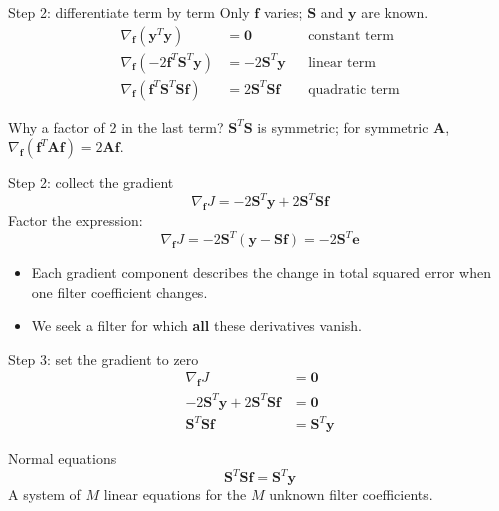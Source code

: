 \documentclass[aspectratio=169,11pt]{beamer}
\newcommand{\Smat}{\mathbf S}
\newcommand{\fvec}{\mathbf f}
\newcommand{\yvec}{\mathbf y}
\newcommand{\evec}{\mathbf e}
\begin{document}
\begin{frame}{Step 2: differentiate term by term}
\small Only $\fvec$ varies; $\Smat$ and $\yvec$ are known.
\begin{align*}
\nabla_{\fvec}(\yvec^T\yvec)&=\mathbf0&&\text{constant term}\\[7pt]
\nabla_{\fvec}(-2\fvec^T\Smat^T\yvec)&=-2\Smat^T\yvec&&\text{linear term}\\[7pt]
\nabla_{\fvec}(\fvec^T\Smat^T\Smat\fvec)&=2\Smat^T\Smat\fvec&&\text{quadratic term}
\end{align*}
\vspace{3mm}
\begin{block}{Why a factor of 2 in the last term?}
$\Smat^T\Smat$ is symmetric; for symmetric $\mathbf A$, $\nabla_{\fvec}(\fvec^T\mathbf A\fvec)=2\mathbf A\fvec$.
\end{block}
\end{frame}

\begin{frame}{Step 2: collect the gradient}
\[\boxed{\nabla_{\fvec}J=-2\Smat^T\yvec+2\Smat^T\Smat\fvec}\]
\vspace{6mm}
Factor the expression:
\[\boxed{\nabla_{\fvec}J=-2\Smat^T(\yvec-\Smat\fvec)=-2\Smat^T\evec}\]
\vspace{5mm}
\begin{itemize}
\item Each gradient component describes the change in total squared error when one filter coefficient changes.
\item We seek a filter for which \textbf{all} these derivatives vanish.
\end{itemize}
\end{frame}

\begin{frame}{Step 3: set the gradient to zero}
\begin{align*}
\nabla_{\fvec}J&=\mathbf0\\[5pt]
-2\Smat^T\yvec+2\Smat^T\Smat\fvec&=\mathbf0\\[5pt]
\Smat^T\Smat\fvec&=\Smat^T\yvec
\end{align*}
\begin{block}{Normal equations}
\[\boxed{\Smat^T\Smat\fvec=\Smat^T\yvec}\]
A system of $M$ linear equations for the $M$ unknown filter coefficients.
\end{block}
\end{frame}
\end{document}
